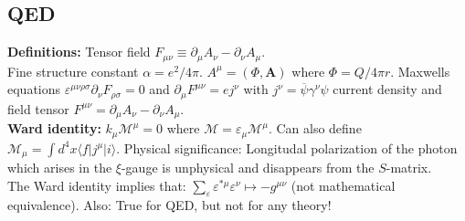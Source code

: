 \documentclass[a4paper, norsk, 8pt, landscape]{article}
\newcommand{\ket}[1] { |#1\rangle }
\newcommand{\bra}[1] { \langle #1 | }
\begin{document}
\begin{multicols*}{3}
\subsection*{\small  QED}
 {\textbf{Definitions:}}
Tensor field $F_{\mu\nu} \equiv \partial_\mu A_\nu - \partial_\nu A_\mu$. \\
Fine structure constant $\alpha=e^2/4\pi$.
$A^\mu=(\Phi,\mathbf{A})$ where $\Phi=Q/4\pi r$. Maxwells equations
$\varepsilon^{\mu\nu\rho \sigma}\partial_\nu F_{\rho \sigma}=0$ and
$\partial_\mu F^{\mu \nu}=ej^{\nu}$ with $j^{\nu}=\overline{\psi}\gamma^\nu \psi$
current density and field tensor $F^{\mu \nu} = \partial_\mu A_\nu - \partial_\nu A_\mu$. \\
 {\textbf{Ward identity:}}
$k_\mu \mathcal{M}^\mu=0$ where $\mathcal{M}=\varepsilon_\mu\mathcal{M}^\mu$.
Can also define $\mathcal{M}_\mu=\int d^4 x \bra{f}j^{\mu} \ket{i}$.
Physical significance: Longitudal polarization of the photon which arises in the $\xi$-gauge is unphysical
and disappears from the $S$-matrix. \\
The Ward identity implies that:
$\sum_\varepsilon \varepsilon^{*\mu}\varepsilon^\nu \mapsto -g^{\mu\nu}$ (not mathematical equivalence).
Also: True for QED, but not for any theory!


















\end{multicols*}
\end{document}

